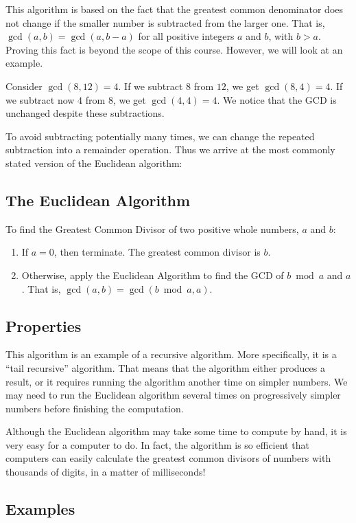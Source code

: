 \documentclass[a4paper,10pt]{report}
\begin{document}
This algorithm is based on the fact that the greatest common denominator does
not change if the smaller number is subtracted from the larger one. That is,
\(\gcd(a, b) = \gcd(a, b - a)\) for all positive integers \(a\) and \(b\), with
\(b>a\). Proving this fact is beyond the scope of this course. However, we will
look at an example.

Consider \(\gcd(8, 12)=4\). If we subtract \(8\) from \(12\), we get \(\gcd(8,
4)=4\). If we subtract now \(4\) from \(8\), we get \(\gcd(4, 4)=4\). We notice
that the GCD is unchanged despite these subtractions.

To avoid subtracting potentially many times, we can change the repeated
subtraction into a remainder operation. Thus we arrive at the most commonly
stated version of the Euclidean algorithm:

\subsection{The Euclidean Algorithm}

To find the Greatest Common Divisor of two positive whole numbers, \(a\) and
\(b\):
\begin{enumerate}
 \item If \(a=0\), then terminate. The greatest common divisor is \(b\).
 \item Otherwise, apply the Euclidean Algorithm to find the GCD of \(b \bmod
 a\) and \(a\). That is, \(\gcd(a, b) = \gcd(b \bmod a, a)\).
\end{enumerate}

\subsection{Properties}

This algorithm is an example of a recursive algorithm. More specifically, it is
a ``tail recursive'' algorithm. That means that the algorithm either produces a
result, or it requires running the algorithm another time on simpler numbers.
We may need to run the Euclidean algorithm several times on progressively
simpler numbers before finishing the computation.

Although the Euclidean algorithm may take some time to compute by hand, it is
very easy for a computer to do. In fact, the algorithm is so efficient that
computers can easily calculate the greatest common divisors of numbers with
thousands of digits, in a matter of milliseconds!

\subsection{Examples}
\end{document}
